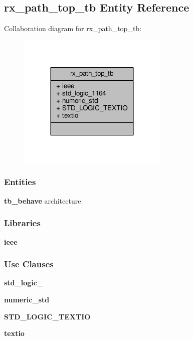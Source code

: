 \subsection{rx\+\_\+path\+\_\+top\+\_\+tb Entity Reference}
\label{classrx__path__top__tb}


Collaboration diagram for rx\+\_\+path\+\_\+top\+\_\+tb\+:\nopagebreak
\begin{figure}[H]
\begin{center}
\leavevmode
\includegraphics[width=203pt]{d9/d84/classrx__path__top__tb__coll__graph}
\end{center}
\end{figure}
\subsubsection*{Entities}
\begin{DoxyCompactItemize}
\item 
{\bf tb\+\_\+behave} architecture
\end{DoxyCompactItemize}
\subsubsection*{Libraries}
 \begin{DoxyCompactItemize}
\item 
{\bf ieee} 
\end{DoxyCompactItemize}
\subsubsection*{Use Clauses}
 \begin{DoxyCompactItemize}
\item 
{\bf std\+\_\+logic\+\_}   
\item 
{\bf numeric\+\_\+std}   
\item 
{\bf S\+T\+D\+\_\+\+L\+O\+G\+I\+C\+\_\+\+T\+E\+X\+T\+IO}   
\item 
{\bf textio}   
\end{DoxyCompactItemize}


